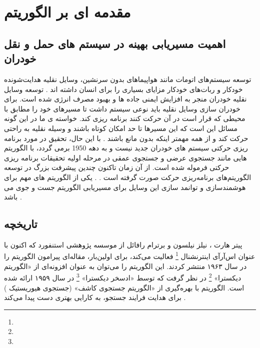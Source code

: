 \chapter{مقدمه ای بر الگوریتم }

\section{اهمیت مسیریابی بهینه در سیستم های حمل و نقل خودران}
توسعه سیستم‌های اتومات مانند هواپیماهای بدون سرنشین، وسایل نقلیه هدایت‌شونده خودکار و ربات‌های خودکار مزایای بسیاری را برای انسان داشته اند . توسعه وسایل نقلیه خودران منجر به افزایش ایمنی جاده ها و بهبود مصرف انرژی شده است. برای خودران سازی وسایل نقلیه باید نوعی سیستم داشت تا مسیرهای خود را مطابق با محیطی که قرار است در آن حرکت کنند برنامه ریزی کند. خواسته ی ما در این گونه مسائل این است که  این مسیرها تا حد امکان کوتاه باشند و وسیله نقلیه به راحتی حرکت کند و از همه مهمتر اینکه بدون مانع باشند .
با این حال، تحقیق در مورد برنامه ریزی حرکتی سیستم های خودران جدید نیست و به دهه 1950 برمی گردد، با الگوریتم هایی مانند جستجوی عرضی و جستجوی عمقی در مرحله اولیه تحقیقات برنامه ریزی حرکتی فرموله شده است. از آن زمان تاکنون چندین پیشرفت بزرگ در توسعه الگوریتم‌های برنامه‌ریزی حرکت صورت گرفته است . 
\cite{paliwal2023survey}
. یکی از الگوریتم های مهم برای هوشمندسازی و توانمد سازی این وسایل برای مسیریابی الگوریتم جست و جوی 
می باشد .
\section{تاریخچه}
پیتر هارت 
، نیلز نیلسون 
و برترام رافائل 
از موسسه پژوهشی استنفورد 
که اکنون با عنوان اس‌آرآی اینترنشنال 
\footnote{} 
فعالیت می‌کند، برای اولین‌بار، مقاله‌ای پیرامون الگوریتم
را در سال ۱۹۶۳ منتشر کردند. این الگوریتم را می‌توان به عنوان افزونه‌ای از «الگوریتم دیکسترا» 
\footnote{}
در نظر گرفت که توسط «ادسخر دیکسترا»
\footnote{}
در سال ۱۹۵۹ ارائه شده است. الگوریتم 
با بهره‌گیری از «الگوریتم جستجوی کاشف» (جستجوی هیوریستیک  
) 
برای هدایت فرایند جستجو، به کارایی بهتری دست پیدا می‌کند
\cite{ELhamalgoritma_star}
.

